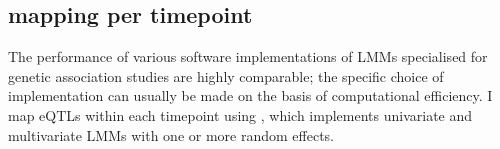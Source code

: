 
\subsection{ mapping per timepoint}

%
The performance of various software implementations of \glspl{LMM} specialised for genetic association studies are highly comparable; 
the specific choice of implementation can usually be made on the basis of computational efficiency\autocite{eu-ahsunthornwattana2014ComparisonMethodsAccount}.
I map \glspl{eQTL} within each timepoint using \autocite{lippert2014LIMIXGeneticAnalysis}, which implements univariate and multivariate \glspl{LMM} with one or more random effects.

